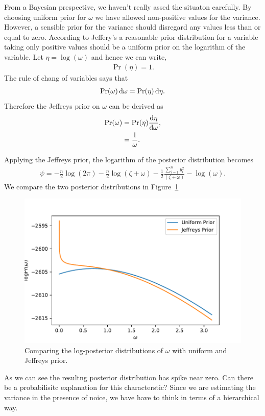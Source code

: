 \documentclass[11pt,twoside,a4paper]{article}
\begin{document}
  From a Bayesian prespective, we haven't really assed the situaton carefully.
  By choosing uniform prior for $\omega$ we have allowed non-positive values
  for the variance. However, a sensible prior for the variance should disregard
  any values less than or equal to zero. According to Jeffery's a reasonable
  prior distribution for a variable taking only positive values should be
  a uniform prior on the logarithm of the variable. Let $\eta = \log(\omega)$
  and hence we can write,
  \begin{align}
    \Pr(\eta) = 1.
  \end{align}
  The rule of chang of variables says that
  \begin{align}
    \Pr(\omega) \dif \omega = \Pr(\eta) \dif \eta.
  \end{align}
  Therefore the Jeffreys prior on $\omega$ can be derived as
  \begin{align}
    \Pr(\omega) &= \Pr(\eta) \frac {\dif \eta}{\dif \omega}, \\
    &= \frac{1}{\omega}.
  \end{align}

  Applying the Jeffreys prior, the logarithm of the posterior distribution
  becomes
  \begin{align}
    \psi  = - \frac{n}{2} \log (2 \pi) - \frac{n}{2} \log (\zeta + \omega)
      - \frac{1}{2} \frac{\sum_{i=1}^n y_i^2}{(\zeta + \omega)} - \log(\omega).
  \end{align}
  We compare the two posterior distributions in
  Figure~\ref{fig_log_post_uniform_jeffreys}
  \begin{figure}
    \includegraphics[scale=0.8]{images/log_post_uniform_jeffreys.pdf}
    \caption{Comparing the log-posterior distributions of $\omega$ with uniform and Jeffreys prior.}
    \label{fig_log_post_uniform_jeffreys}
  \end{figure}
  As we can see the resultng posterior distribution has spike near zero. Can
  there be a probabilisitc explanation for this characterstic? Since we are
  estimating the variance in the presence of noice, we have have to think in
  terms of a hierarchical way.
\end{document}
